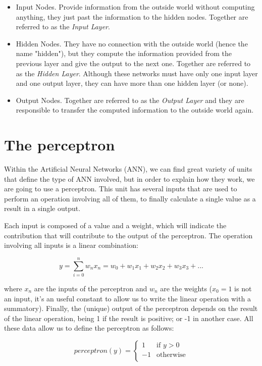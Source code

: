 \begin{itemize}
	\item Input Nodes. Provide information from the outside world without computing anything, they just past the information to the hidden nodes. Together are referred to as the \textit{Input Layer}. 
	\item Hidden Nodes. They have no connection with the outside world (hence the name "hidden"), but they compute the information provided from the previous layer and give the output to the next one. Together are referred to as the \textit{Hidden Layer}. Although these networks must have only one input layer and one output layer, they can have more than one hidden layer (or none). 
	\item Output Nodes. Together are referred to as the \textit{Output Layer} and they are responsible to transfer the computed information to the outside world again.
\end{itemize}

\section{The perceptron}
Within the Artificial Neural Networks (ANN), we can find great variety of units that define the type of ANN involved, but in order to explain how they work, we are going to use a perceptron. This unit has several inputs that are used to perform an operation involving all of them, to finally calculate a single value as a result in a single output.

Each input is composed of a value and a weight, which will indicate the contribution that will contribute to the output of the perceptron. The operation involving all inputs is a linear combination:

\begin{equation}
    \label{linear_combination}
        y=\sum_{i=0}^{n} w_n x_n = w_0 + w_1 x_1 + w_2 x_2 + w_3 x_3 + ...%
\end{equation}

where $x_n$ are the inputs of the perceptron and $w_n$ are the weights ($x_0=1$ is not an input, it's an useful constant to allow us to write the linear operation with a summatory). Finally, the (unique) output of the perceptron depends on the result of the linear operation, being 1 if the result is positive; or -1 in another case. All these data allow us to define the perceptron as follows:

\begin{equation}
    \label{perceptron_rule}
	perceptron(y) =
		\begin{cases}
	     	1 & \text{if $y>0$} \\
	        -1 & \text{otherwise} \\
		\end{cases}
\end{equation}

